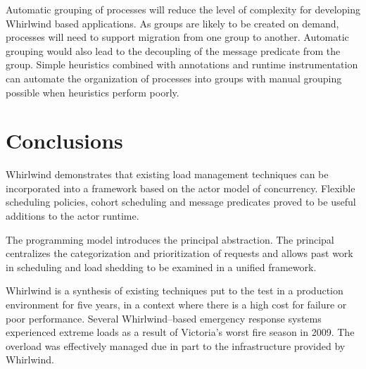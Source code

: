 \documentclass[conference,a4paper,final]{IEEEtran}
\begin{document}
Automatic grouping of processes will reduce the level of complexity for developing Whirlwind based applications. As groups are likely to be created on demand, processes will need to support migration from one group to another. Automatic grouping would also lead to the decoupling of the message predicate from the group. Simple heuristics combined with annotations and runtime instrumentation can automate the organization of processes into groups with manual grouping possible when heuristics perform poorly.

\section{Conclusions}

Whirlwind demonstrates that existing load management techniques can be incorporated into a framework based on the actor model of concurrency. Flexible scheduling policies, cohort scheduling and message predicates proved to be useful additions to the actor runtime. 

The programming model introduces the principal abstraction. The principal centralizes the categorization and prioritization of requests and allows past work in scheduling and load shedding to be examined in a unified framework.

Whirlwind is a synthesis of existing techniques put to the test in a production environment for five years, in a context where there is a high cost for failure or poor performance. Several Whirlwind--based emergency response systems experienced extreme loads as a result of Victoria's worst fire season in 2009. The overload was effectively managed due in part to the infrastructure provided by Whirlwind.



\end{document}
